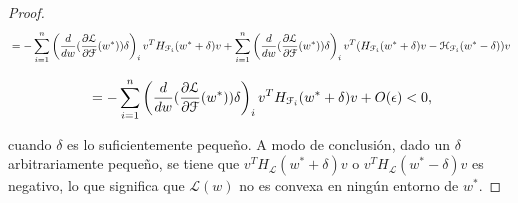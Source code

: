 \begin{proof}
    \[
        \\ = -\sum_{i=1}^{n} \left( \frac{d}{dw} (\frac{\partial \mathcal{L}}{\partial \mathcal{F}}(w^*))\delta \right)_i v^T H_{\mathcal{F}_i}(w^* + \delta) v + \sum_{i=1}^{n} \left( \frac{d}{dw} (\frac{\partial \mathcal{L}}{\partial \mathcal{F}}(w^*))\delta \right)_i v^T (H_{\mathcal{F}_i}(w^* + \delta) v - \mathcal{H}_{\mathcal{F}_i}(w^* - \delta)) v
    \]

    \[
        \\ = -\sum_{i=1}^{n} \left( \frac{d}{dw} (\frac{\partial \mathcal{L}}{\partial \mathcal{F}}(w^*))\delta \right)_i v^T H_{\mathcal{F}_i}(w^* + \delta) v + O(\epsilon) < 0,
    \]
    
    cuando $\delta$ es lo suficientemente pequeño. A modo de conclusión, dado un $\delta$ arbitrariamente pequeño, se tiene que $v^T H_{\mathcal{L}}(w^* + \delta) v$ o $v^T H_{\mathcal{L}}(w^* - \delta) v$ es negativo, lo que significa que $\mathcal{L}(w)$ no es convexa en ningún entorno de $w^*$.

\end{proof}

\endinput

